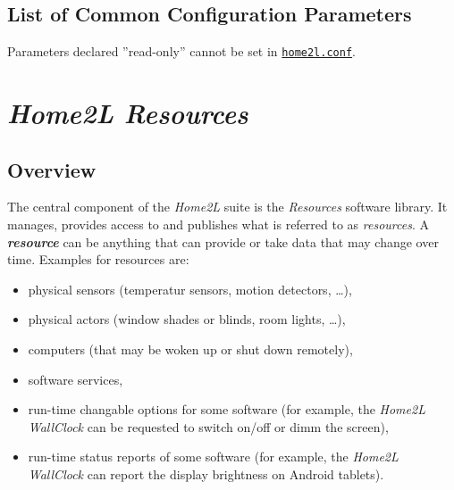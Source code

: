 \documentclass[12pt,english,parskip=half,headheight=19pt]{scrreprt}
\newcommand{\idx}[1]{#1\index{#1}}
\newcommand{\reftool}[1]{\hyperref[tool:#1]{\texttt{\idx{#1}}}}
\begin{document}
\section{List of Common Configuration Parameters}
\label{sec:env-common}

Parameters declared ''read-only'' cannot be set in \reftool{home2l.conf}.










%
\chapter{\textit{Home2L Resources}}
\label{ch:resources}
%



\section{Overview}
\label{sec:resources-overview}


The central component of the \textit{Home2L} suite is the \textit{Resources}
software library. It manages, provides access to and publishes what is referred
to as \textit{resources}. A \textbf{\textit{resource}} can be anything that can
provide or take data that may change over time.
Examples for resources are:

\begin{itemize}
\item
  physical sensors (temperatur sensors, motion detectors, \ldots{}),
\item
  physical actors (window shades or blinds, room lights, \ldots{}),
\item
  computers (that may be woken up or shut down remotely),
\item
  software services,
\item
  run-time changable options for some software (for example, the
  \textit{Home2L WallClock} can be requested to switch on/off or dimm the
  screen),
\item
  run-time status reports of some software (for example, the
  \textit{Home2L WallClock} can report the display brightness on Android
  tablets).
\end{itemize}
\end{document}
